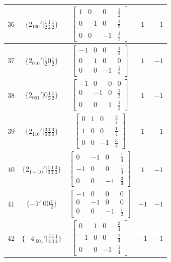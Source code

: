 \documentclass[fleqn,8pt]{jsarticle}
\begin{document}
\begin{longtable}{ccccc}
$ 36 $ & $ \{2{}_{100}{}'|\frac{1}{2} \frac{1}{2} \frac{1}{2}\} $ & $ \begin{bmatrix} 1 & 0 & 0 & \frac{1}{2} \\ 0 & -1 & 0 & \frac{1}{2} \\ 0 & 0 & -1 & \frac{1}{2} \end{bmatrix} $ & $ 1 $ & $ -1 $ \\ \hline
$ 37 $ & $ \{2{}_{010}{}'|\frac{1}{2} 0 \frac{1}{2}\} $ & $ \begin{bmatrix} -1 & 0 & 0 & \frac{1}{2} \\ 0 & 1 & 0 & 0 \\ 0 & 0 & -1 & \frac{1}{2} \end{bmatrix} $ & $ 1 $ & $ -1 $ \\ \hline
$ 38 $ & $ \{2{}_{001}{}'|0 \frac{1}{2} \frac{1}{2}\} $ & $ \begin{bmatrix} -1 & 0 & 0 & 0 \\ 0 & -1 & 0 & \frac{1}{2} \\ 0 & 0 & 1 & \frac{1}{2} \end{bmatrix} $ & $ 1 $ & $ -1 $ \\ \hline
$ 39 $ & $ \{2{}_{110}{}'|\frac{3}{4} \frac{1}{4} \frac{3}{4}\} $ & $ \begin{bmatrix} 0 & 1 & 0 & \frac{3}{4} \\ 1 & 0 & 0 & \frac{1}{4} \\ 0 & 0 & -1 & \frac{3}{4} \end{bmatrix} $ & $ 1 $ & $ -1 $ \\ \hline
$ 40 $ & $ \{2{}_{1-10}{}'|\frac{1}{4} \frac{1}{4} \frac{3}{4}\} $ & $ \begin{bmatrix} 0 & -1 & 0 & \frac{1}{4} \\ -1 & 0 & 0 & \frac{1}{4} \\ 0 & 0 & -1 & \frac{3}{4} \end{bmatrix} $ & $ 1 $ & $ -1 $ \\ \hline
$ 41 $ & $ \{-1{}'|0 0 \frac{1}{2}\} $ & $ \begin{bmatrix} -1 & 0 & 0 & 0 \\ 0 & -1 & 0 & 0 \\ 0 & 0 & -1 & \frac{1}{2} \end{bmatrix} $ & $ -1 $ & $ -1 $ \\ \hline
$ 42 $ & $ \{-4^{+}_{\,\,001}{}'|\frac{3}{4} \frac{1}{4} \frac{1}{4}\} $ & $ \begin{bmatrix} 0 & 1 & 0 & \frac{3}{4} \\ -1 & 0 & 0 & \frac{1}{4} \\ 0 & 0 & -1 & \frac{1}{4} \end{bmatrix} $ & $ -1 $ & $ -1 $ \\ \hline

\end{longtable}
\end{document}
